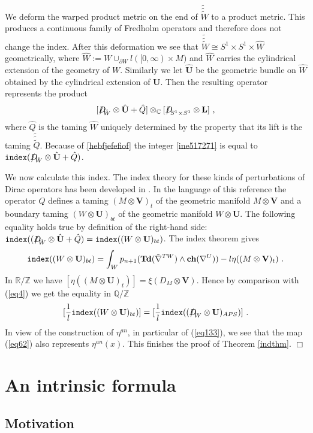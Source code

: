 \documentclass[12pt]{article}
\def\hB{\hspace*{\fill}$\Box$ \newline\noindent}
\newcommand{\Z}{{\mathbb{Z}}}
\newcommand{\Q}{{\mathbb{Q}}}
\newcommand{\R}{{\mathbb{R}}}
\newcommand{\C}{{\mathbb{C}}}
\newcommand{\Td}{{\mathbf{Td}}}
\newcommand{\ch}{{\mathbf{ch}}}
\newcommand{\bV}{{\mathbf{V}}}
\newcommand{\bU}{{\mathbf{U}}}
\newcommand{\Dirac}{{D\hspace{-0.27cm}/}}
\newcommand{\ind}{{\tt index}}
\begin{document}
We deform the warped product metric on the end of $\tilde{\tilde {\tilde{W}}}$ to a product metric. This produces a continuous family of Fredholm operators and therefore does not change the index. After this deformation we see that
 $\tilde{\tilde {\tilde{W}}}\cong S^{1}\times S^{1}\times \hat W$ geometrically, where
$\hat W:=W\cup_{\partial W} l([0,\infty)\times M)$  and  $\hat W$  carries the  cylindrical extension of the geometry of $W$. Similarly we let $\hat \bU$ be the geometric bundle on $\hat W$ obtained by the cylindrical extension of $\bU$. Then the resulting   operator 
represents the product
$$[\Dirac_{\hat W}\otimes \hat \bU+\hat Q]\otimes_{\C}[\Dirac_{S^{1}\times S^{1}}\otimes \bL]\ ,$$
where  $\hat Q$  is the  taming   $\hat W$ uniquely determined by the property that its lift  is  the taming $\tilde{\tilde{\tilde Q}}$. Because of \eqref{hebfjefefiof}
 the  integer \eqref{ine517271}
  is equal to 
 $\ind(\Dirac_{\hat W}\otimes \hat \bU+\hat Q)$.

We now calculate this index. The index theory for these kinds of perturbations of Dirac operators
has been developed in  \cite{MR2191484}. In the language of this reference
 the operator $Q$ defines a
 taming $(M\otimes \bV)_{t}$  of the geometric manifold $M\otimes \bV$ and
a boundary taming $(W\otimes \bU)_{bt}$ of the geometric manifold $W\otimes \bU$. 
The following equality holds true by  definition of the right-hand side:
$\ind((\Dirac_{\hat W}\otimes \hat \bU+\hat Q)= \ind((W\otimes \bU)_{bt})$. The index theorem  
\cite[Thm. 4.18]{MR2191484} gives
  $$\ind((W\otimes \bU)_{bt})=\int_{W} p_{n+1}(\Td(\tilde \nabla^{TW})\wedge \ch(\nabla^{U}))-l\eta((M\otimes \bV)_{t}) \ .$$
 In $\R/\Z$ we have
 $[\eta((M\otimes \bU)_{t})]=\xi(D_{M}\otimes \bV)$.
 Hence by comparison with (\ref{eq4}) we get the equality in $\Q/\Z$
$$[\frac{1}{l}\ind((W\otimes \bU)_{bt})]=[\frac{1}{l}\ind((\Dirac_{W}\otimes \bU)_{APS})]\ .$$
In view of the construction of $\eta^{an}$, in particular of (\ref{eq133}),  we see that the map (\ref{eq62})
also represents $\eta^{an}(x)$.
This finishes the proof of Theorem \ref{indthm}. 
\hB
\section{An intrinsic formula}\label{sec444}

\subsection{Motivation}
\end{document}
